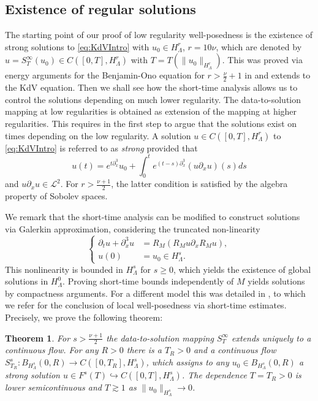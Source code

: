 \documentclass{amsart}
\newtheorem{theorem}{Theorem}[section]
\theoremstyle{definition}
\begin{document}
\subsection{Existence of regular solutions}

The starting point of our proof of low regularity well-posedness is the existence of strong solutions to \eqref{eq:KdVIntro} with $u_0 \in H^r_{\Lambda}$, $r = 10 \nu$, which are denoted by $u = S_T^{\infty}(u_0) \in C([0,T],H^r_\Lambda)$ with $T=T(\| u_0 \|_{H^r_\Lambda})$. This was proved via energy arguments for the Benjamin-Ono equation for $r > \frac{\nu}{2}+1$ in \cite{AitzhanAmbrose2024} and extends to the KdV equation. Then we shall see how the short-time analysis allows us to control the solutions depending on much lower regularity. The data-to-solution mapping at low regularities is obtained as extension of the mapping at higher regularities. This requires in the first step to argue that the solutions exist on times depending on the low regularity.
A solution $u \in C([0,T],H^r_{\Lambda})$ to \eqref{eq:KdVIntro} is referred to as \emph{strong} provided that
\begin{equation*}
u(t) = e^{t \partial_x^3} u_0 + \int_0^t e^{(t-s)\partial_x^3} (u \partial_x u)(s) ds
\end{equation*}
and $u \partial_x u \in \mathcal{L}^2$. For $r > \frac{\nu+1}{2}$, the latter condition is satisfied by the algebra property of Sobolev spaces.

We remark that the short-time analysis can be modified to construct solutions via Galerkin approximation, considering the truncated non-linearity
\begin{equation*}
\left\{ \begin{array}{cl}
\partial_t u + \partial_x^3 u &= R_M (R_M u \partial_x  R_M u), \\
u(0) &= u_0 \in H^s_\Lambda.
\end{array} \right.
\end{equation*}
This nonlinearity is bounded in $H^s_\Lambda$ for $s \geq 0$, which yields the existence of global solutions in $H^0_\Lambda$. Proving short-time bounds independently of $M$ yields solutions by compactness arguments. For a different model this was detailed in \cite{HerrSchippaTzvetkov2026}, to which we refer for the conclusion of local well-posedness via short-time estimates. Precisely, we prove the following theorem:
\begin{theorem}
For $s > \frac{\nu+1}{2}$ the data-to-solution mapping $S_T^{\infty}$ extends uniquely to a continuous flow. For any $R>0$ there is a $T_R > 0$ and a continuous flow $S_{T_R}^s : B_{H^s_\Lambda}(0,R) \to C([0,T_R],H^s_{\Lambda})$, which assigns to any $u_0 \in B_{H^s_\Lambda}(0,R)$ a strong solution $u \in F^s(T) \hookrightarrow C([0,T],H^s_\Lambda)$. The dependence $T=T_R > 0$ is lower semicontinuous and $T \gtrsim 1$ as $\| u_0 \|_{H^s_\Lambda} \to 0$. 
\end{theorem}
\end{document}
